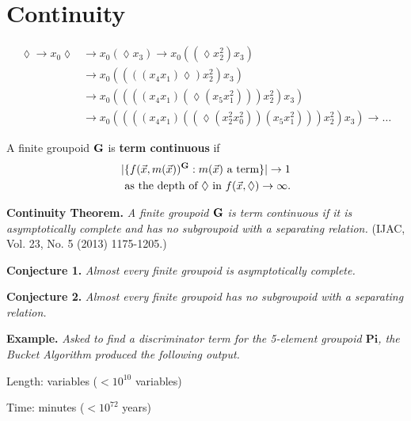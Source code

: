 \documentclass{beamer}
\newcommand{\lz}{{\lozenge}}
\newcommand{\G}{{\rm{\textbf{G}}}}
\newcommand{\bbF}{\mathbb F}
\newcommand{\bbM}{\mathbb M}
\newcommand{\vx}{\vec x}
\begin{document}
\begin{comment}
\put(-2,0){
\put(20,2){$\bbM_0$}   \put(20,12){$\bbM_1$}  \put(18,27){$\bbM_{n^k}$}
\put(93,2){$\bbF_0$}   \put(92,12){$\bbF_1$}  \put(89,27){$\bbF_{n^k}$}
 }
 
 \normalsize
 
 \put(14,-27){$x_2((x_7\lz)x_4)$}
 }
\end{picture}
\end{figure}

\end{frame}

\end{comment}




\section{Continuity}

\begin{frame}


\begin{align*}
\lz \to x_0\lz &\to x_0(\lz x_3) \to x_0((\lz x_2^2)x_3)\\ 
                      &\to x_0((((x_4x_1)\lz)x_2^2)x_3) \\
                      &\to x_0((((x_4x_1)(\lz (x_5x_1^2)))x_2^2)x_3) \\
                      &\to x_0((((x_4x_1)((\lz(x_2^2x_0^2))(x_5x_1^2)))x_2^2)x_3) \to \dots
\end{align*}
\pause

 A finite groupoid $\G$ is \textbf{term continuous} if 
 \begin{gather*}
|\{f(\vx,m(\vx))^\G : m(\vx) \mbox{ a term}\}| \to 1\\
   \mbox{ as the depth of $\lz$ in } f(\vx,\lz) \to \infty.
 \end{gather*}
\pause

\textbf{Continuity Theorem. }  {\it A finite groupoid $\G$ is term continuous if it is asymptotically complete and has no subgroupoid with a separating relation.}  \pause  (IJAC, Vol. 23, No. 5 (2013) 1175-1205.)
\medskip

\end{frame}




\begin{frame}
\textbf{Conjecture 1. }  {\it Almost every finite groupoid is asymptotically complete.} 
\pause
\medskip

\textbf{Conjecture 2. }  {\it Almost every finite groupoid has no subgroupoid with a separating relation.}
\pause
\medskip

\textbf{Example. }  {\it Asked to find a discriminator term for the 5-element groupoid\/ $\mathbf{Pi}$, the Bucket Algorithm produced the following output.} \pause
\medskip

Length:  variables ($ < 10^{10}$ variables)
\pause

Time:  minutes ($ < 10^{72}$ years)
\end{frame}
\end{document}
